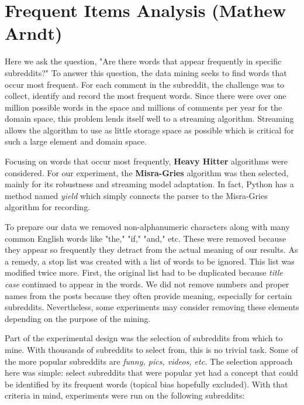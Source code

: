 \documentclass[12pt]{article}
\numberwithin{equation}{section}
\begin{document}
	

\section*{Frequent Items Analysis (Mathew Arndt)}	
	
Here we ask the question, "Are there words that appear frequently in specific subreddits?"  To answer this question, the data mining seeks to find words that occur most frequent.  For each comment in the subreddit, the challenge was to collect, identify and record the most frequent words.  Since there were over one million possible words in the space and millions of comments per year for the domain space, this problem lends itself well to a streaming algorithm.  Streaming allows the algorithm to use as little storage space as possible which is critical for such a large element and domain space.  

Focusing on words that occur most frequently, \textbf{Heavy Hitter} algorithms were considered.  For our experiment, the \textbf{Misra-Gries} algorithm was then selected, mainly for its robustness and streaming model adaptation.  In fact, Python has a method named \textit{yield} which simply connects the parser to the Misra-Gries algorithm for recording.

To prepare our data we removed non-alphanumeric characters along with many common English words like "the," "if," "and," etc.   These were removed because they appear so frequently they detract from the actual meaning of our results.    As a remedy, a stop list was created with a list of words to be ignored.  This list was modified twice more.  First, the original list had to be duplicated because \textit{title case} continued to appear in the words.   We did not remove numbers and proper names from the posts because they often provide meaning, especially for certain subreddits.  Nevertheless, some experiments may consider removing these elements depending on the purpose of the mining.

Part of the experimental design was the selection of subreddits from which to mine.  With thousands of subreddits to select from, this is no trivial task.  Some of the more popular subreddits are \textit{funny, pics, videos, etc.}  The selection approach here was simple:  select subreddits that were popular yet had a concept that could be identified by its frequent words (topical bias hopefully excluded).   With that criteria in mind, experiments were run on the following subreddits: 
\end{document}
